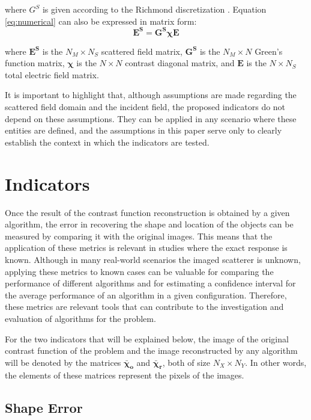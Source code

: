 \documentclass{ieeeaccess}
\newcommand{\Es}{\mathbf{E^S}}
\newcommand{\GS}{\mathbf{G^S}}
\newcommand{\X}{\boldsymbol{\chi}}
\newcommand{\E}{\mathbf{E}}
\newcommand{\Xo}{\boldsymbol{\bar{\chi}_o}}
\newcommand{\Xr}{\boldsymbol{\bar{\chi}_r}}
\begin{document}
    \noindent where $G^S$ is given according to the Richmond discretization \cite{richmond1965scattering, pastorino2010ch3}. Equation \eqref{eq:numerical} can also be expressed in matrix form:
    \begin{equation}
        \Es = \GS\X\E
    \end{equation}
    
    \noindent where $\Es$ is the $N_M \times N_S$ scattered field matrix, $\GS$ is the $N_M \times N$ Green's function matrix, $\X$ is the $N \times N$ contrast diagonal matrix, and $\E$ is the $N \times N_S$ total electric field matrix.
    
    It is important to highlight that, although assumptions are made regarding the scattered field domain and the incident field, the proposed indicators do not depend on these assumptions. They can be applied in any scenario where these entities are defined, and the assumptions in this paper serve only to clearly establish the context in which the indicators are tested.

\section{Indicators}\label{sec:indicators}

    Once the result of the contrast function reconstruction is obtained by a given algorithm, the error in recovering the shape and location of the objects can be measured by comparing it with the original images. This means that the application of these metrics is relevant in studies where the exact response is known. Although in many real-world scenarios the imaged scatterer is unknown, applying these metrics to known cases can be valuable for comparing the performance of different algorithms and for estimating a confidence interval for the average performance of an algorithm in a given configuration. Therefore, these metrics are relevant tools that can contribute to the investigation and evaluation of algorithms for the problem.
    
    For the two indicators that will be explained below, the image of the original contrast function of the problem and the image reconstructed by any algorithm will be denoted by the matrices $\Xo$ and $\Xr$, both of size $N_X \times N_Y$. In other words, the elements of these matrices represent the pixels of the images.

    \subsection{Shape Error}\label{sec:indicators:shapeerror}
\end{document}
